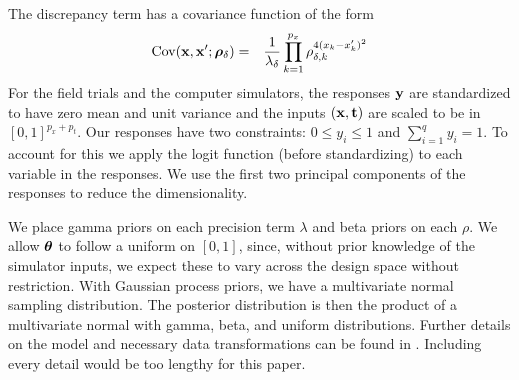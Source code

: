 The discrepancy term has a covariance function of the form
\begin{eqnarray}
\mathrm{Cov}(\mathbf{\bm{x}},\mathbf{\bm{x}}'; \mathbf{\bm{\rho}}_\delta) &=& \frac{1}{\lambda_\delta}\prod_{k=1}^{p_x}\rho_{\delta,k}^{4(x_k-x_k')^2}
\end{eqnarray}
For the field trials and the computer simulators, the responses $\mathbf{\bm{y}}$ are standardized to have zero mean and unit variance and the inputs $(\mathbf{\bm{x}}, \mathbf{\bm{t}})$ are scaled to be in $[0,1]^{p_x+p_t}$. Our responses have two constraints: $0\leq y_i \leq 1$ and $\sum_{i=1}^q y_i = 1$. To account for this we apply the logit function (before standardizing) to each variable in the responses. We use the first two principal components of the responses to reduce the dimensionality.

We place gamma priors on each precision term $\lambda$ and beta priors on each $\rho$. We allow $\mathbf{\bm{\theta}}$ to follow a uniform on $[0,1]$, since, without prior knowledge of the simulator inputs, we expect these to vary across the design space without restriction. With Gaussian process priors, we have a multivariate normal sampling distribution. The posterior distribution is then the product of a multivariate normal with gamma, beta, and uniform distributions. Further details on the model and necessary data transformations can be found in \cite{higdon:2008}. Including every detail would be too lengthy for this paper.
